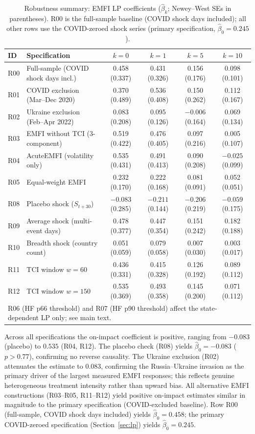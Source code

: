 \documentclass[11pt]{article}
\begin{document}
\begin{table}[ht]
\centering
\small
\caption{Robustness summary: EMFI LP coefficients ($\hat\beta_k$; Newey--West SEs in parentheses).
  R00 is the full-sample baseline (COVID shock days included); all other rows use
  the COVID-zeroed shock series (primary specification, $\hat\beta_0 = 0.245$).}
\label{tab:app_robustness}
\begin{tabular}{llcccc}
\hline\hline
ID & Specification & $k=0$ & $k=1$ & $k=5$ & $k=10$ \\
\hline
R00 & Full-sample (COVID shock days incl.)
    & 0.458 (0.337) & 0.431 (0.326) & 0.156 (0.176) & 0.098 (0.101) \\
R01 & COVID exclusion (Mar--Dec 2020)
    & 0.370 (0.489) & 0.536 (0.408) & 0.150 (0.262) & 0.112 (0.167) \\
R02 & Ukraine exclusion (Feb--Apr 2022)
    & 0.083 (0.208) & 0.095 (0.126) & $-0.006$ (0.164) & 0.069 (0.134) \\
R03 & EMFI without TCI (3-component)
    & 0.519 (0.422) & 0.476 (0.405) & 0.097 (0.216) & 0.005 (0.107) \\
R04 & AcuteEMFI (volatility only)
    & 0.535 (0.431) & 0.491 (0.413) & 0.090 (0.208) & $-0.025$ (0.099) \\
R05 & Equal-weight EMFI
    & 0.232 (0.170) & 0.222 (0.168) & 0.081 (0.091) & 0.052 (0.051) \\
R08 & Placebo shock ($S_{t+30}$)
    & $-0.083$ (0.285) & $-0.211$ (0.144) & $-0.206$ (0.219) & $-0.059$ (0.175) \\
R09 & Average shock (multi-event days)
    & 0.478 (0.377) & 0.447 (0.354) & 0.151 (0.242) & 0.182 (0.188) \\
R10 & Breadth shock (country count)
    & 0.051 (0.059) & 0.079 (0.058) & 0.007 (0.030) & 0.003 (0.017) \\
R11 & TCI window $w=60$
    & 0.436 (0.331) & 0.415 (0.328) & 0.126 (0.192) & 0.089 (0.112) \\
R12 & TCI window $w=150$
    & 0.535 (0.369) & 0.493 (0.358) & 0.145 (0.200) & 0.071 (0.112) \\
\hline\hline
\multicolumn{6}{l}{\footnotesize R06 (HF p66 threshold) and R07 (HF p90 threshold) affect the state-dependent LP only; see main text.}
\end{tabular}
\end{table}

\noindent Across all specifications the on-impact coefficient is positive, ranging from $-0.083$ (placebo) to $0.535$ (R04, R12). The placebo check (R08) yields $\hat\beta_0 = -0.083$ ($p > 0.77$), confirming no reverse causality. The Ukraine exclusion (R02) attenuates the estimate to 0.083, confirming the Russia--Ukraine invasion as the primary driver of the largest measured EMFI responses; this reflects genuine heterogeneous treatment intensity rather than upward bias. All alternative EMFI constructions (R03--R05, R11--R12) yield positive on-impact estimates similar in magnitude to the primary specification (COVID-excluded baseline). Row R00 (full-sample, COVID shock days included) yields $\hat\beta_0 = 0.458$;
the primary COVID-zeroed specification (Section~\ref{sec:lp}) yields $\hat\beta_0 = 0.245$.
\end{document}
